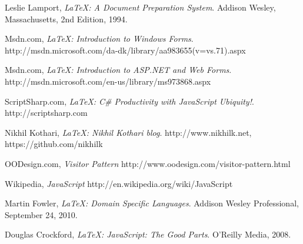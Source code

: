 \begin{thebibliography}{9}
  Leslie Lamport,
  \emph{\LaTeX: A Document Preparation System}.
  Addison Wesley, Massachusetts,
  2nd Edition,
  1994.


  Msdn.com,
  \emph{\LaTeX: Introduction to Windows Forms}.
  http://msdn.microsoft.com/da-dk/library/aa983655(v=vs.71).aspx

  Msdn.com,
  \emph{\LaTeX: Introduction to ASP.NET and Web Forms}.
  http://msdn.microsoft.com/en-us/library/ms973868.aspx

  ScriptSharp.com,
  \emph{\LaTeX: C\# Productivity with JavaScript Ubiquity!}.
  http://scriptsharp.com

  Nikhil Kothari,
  \emph{\LaTeX: Nikhil Kothari blog}.
  http://www.nikhilk.net, https://github.com/nikhilk
  
  OODesign.com,
  \emph{Visitor Pattern}
  http://www.oodesign.com/visitor-pattern.html

  Wikipedia,
  \emph{JavaScript}
  http://en.wikipedia.org/wiki/JavaScript

  Martin Fowler,
  \emph{\LaTeX: Domain Specific Languages}.
  Addison Wesley Professional,
  September 24, 2010.

  Douglas Crockford,
  \emph{\LaTeX: JavaScript: The Good Parts}.
  O’Reilly Media,
  2008.

\end{thebibliography}










